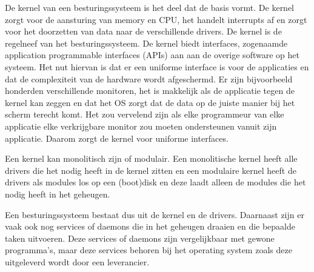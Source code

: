 De kernel van een besturingssysteem is het deel dat de basis vormt. De kernel zorgt voor de aansturing van memory en CPU, het handelt interrupts af en zorgt voor het doorzetten van data naar de verschillende drivers. De kernel is de regelneef van het besturingssysteem. De kernel biedt interfaces, zogenaamde application programmable interfaces (APIs) aan aan de overige software op het systeem. Het nut hiervan is dat er een uniforme interface is voor de applicaties en dat de complexiteit van de hardware wordt afgeschermd. Er zijn bijvoorbeeld honderden verschillende monitoren, het is makkelijk als de applicatie tegen de kernel kan zeggen  en dat het OS zorgt dat de data op de juiste manier bij het scherm terecht komt. Het zou vervelend zijn als elke programmeur van elke applicatie elke verkrijgbare monitor zou moeten ondersteunen vanuit zijn applicatie. Daarom zorgt de kernel voor uniforme interfaces.

Een kernel kan monolitisch zijn of modulair. Een monolitische kernel heeft alle drivers die het nodig heeft in de kernel zitten en een modulaire kernel heeft de drivers als modules los op een (boot)disk en deze laadt alleen de modules die het nodig heeft in het geheugen.

Een besturingssysteem bestaat dus uit de kernel en de drivers. Daarnaast zijn er vaak ook nog services of daemons die in het geheugen draaien en die bepaalde taken uitvoeren. Deze services of daemons zijn vergelijkbaar met gewone programma's, maar deze services behoren bij het operating system zoals deze uitgeleverd wordt door een leverancier.

